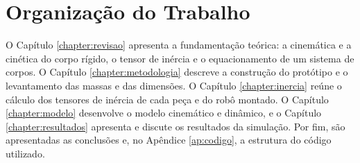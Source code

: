 \section{Organização do Trabalho}

O Capítulo \ref{chapter:revisao} apresenta a fundamentação teórica: a cinemática e a cinética do corpo rígido, o tensor de inércia e o equacionamento de um sistema de corpos. O Capítulo \ref{chapter:metodologia} descreve a construção do protótipo e o levantamento das massas e das dimensões. O Capítulo \ref{chapter:inercia} reúne o cálculo dos tensores de inércia de cada peça e do robô montado. O Capítulo \ref{chapter:modelo} desenvolve o modelo cinemático e dinâmico, e o Capítulo \ref{chapter:resultados} apresenta e discute os resultados da simulação. Por fim, são apresentadas as conclusões e, no Apêndice \ref{ap:codigo}, a estrutura do código utilizado.
